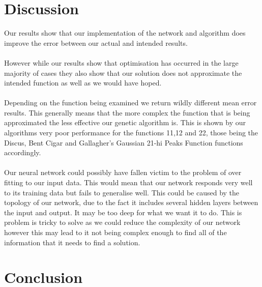 \documentclass[12pt]{article}
\begin{document}
\section{Discussion}
Our results show that our implementation of the network and algorithm does improve the error between our actual and intended results. \\\\
However while our results show that optimisation has occurred in the large majority of cases they also show that our solution does not approximate the intended function as well as we would have hoped.\\\\
Depending on the function being examined we return wildly different mean error results. This generally means that the more complex the function that is being approximated the less effective our genetic algorithm is. This is shown by our algorithms very poor performance for the functions 11,12 and 22, those being the Discus, Bent Cigar and Gallagher's Gaussian 21-hi Peaks Function functions accordingly.\\\\
Our neural network could possibly have fallen victim to the problem of over fitting to our input data. This would mean that our network responds very well to its training data but fails to generalise well. This could be caused by the topology of our network, due to the fact it includes several hidden layers between the input and output. It may be too deep for what we want it to do. This is problem is tricky to solve as we could reduce the complexity of our network however this may lead to it not being complex enough to find all of the information that it needs to find a solution.


\newpage
\section{Conclusion}
\end{document}
